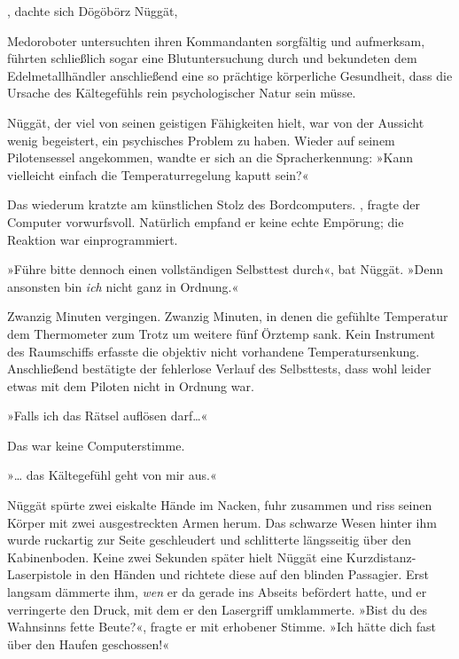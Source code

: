 , dachte sich Dögöbörz Nüggät, 

Medoroboter untersuchten ihren Kommandanten sorgfältig und aufmerksam, führten schließlich sogar eine Blutuntersuchung durch und bekundeten dem Edelmetallhändler anschließend eine so prächtige körperliche Gesundheit, dass die Ursache des Kältegefühls rein psychologischer Natur sein müsse.

Nüggät, der viel von seinen geistigen Fähigkeiten hielt, war von der Aussicht wenig begeistert, ein psychisches Problem zu haben. Wieder auf seinem Pilotensessel angekommen, wandte er sich an die Spracherkennung: »Kann vielleicht einfach die Temperaturregelung kaputt sein?«

Das wiederum kratzte am künstlichen Stolz des Bordcomputers. , fragte der Computer vorwurfsvoll. Natürlich empfand er keine echte Empörung; die Reaktion war einprogrammiert. 

»Führe bitte dennoch einen vollständigen Selbsttest durch«, bat Nüggät. »Denn ansonsten bin \emph{ich} nicht ganz in Ordnung.«

Zwanzig Minuten vergingen. Zwanzig Minuten, in denen die gefühlte Temperatur dem Thermometer zum Trotz um weitere fünf Örztemp sank. Kein Instrument des Raumschiffs erfasste die objektiv nicht vorhandene Temperatursenkung. Anschließend bestätigte der fehlerlose Verlauf des Selbsttests, dass wohl leider etwas mit dem Piloten nicht in Ordnung war.

»Falls ich das Rätsel auflösen darf…«

Das war keine Computerstimme.

»… das Kältegefühl geht von mir aus.«

Nüggät spürte zwei eiskalte Hände im Nacken, fuhr zusammen und riss seinen Körper mit zwei ausgestreckten Armen herum. Das schwarze Wesen hinter ihm wurde ruckartig zur Seite geschleudert und schlitterte längsseitig über den Kabinenboden. Keine zwei Sekunden später hielt Nüggät eine Kurzdistanz-Laserpistole in den Händen und richtete diese auf den blinden Passagier. Erst langsam dämmerte ihm, \emph{wen} er da gerade ins Abseits befördert hatte, und er verringerte den Druck, mit dem er den Lasergriff umklammerte. »Bist du des Wahnsinns fette Beute?«, fragte er mit erhobener Stimme. »Ich hätte dich fast über den Haufen geschossen!«


